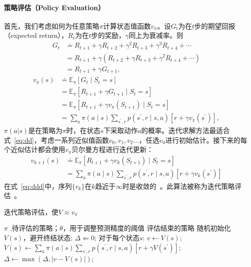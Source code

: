 \paragraph{策略评估（Policy Evaluation）}
首先，我们考虑如何为任意策略$\pi$计算状态值函数$v_{\pi}$。设$G_{t}$为在$t$步的期望回报（expected return），$R_{t}$为在$t$步的奖励，$\gamma$同上为衰减率。则
\begin{equation*}
  \begin{aligned}
  G_{t} & \doteq R_{t+1}+\gamma R_{t+2}+\gamma^{2} R_{t+3}+\gamma^{3} R_{t+4}+\cdots \\
  &=R_{t+1}+\gamma\left(R_{t+2}+\gamma R_{t+3}+\gamma^{2} R_{t+4}+\cdots\right) \\
  &=R_{t+1}+\gamma G_{t+1},
  \end{aligned}
\end{equation*}
\begin{equation}
  \begin{aligned}
  v_{\pi}(s) & \doteq \mathbb{E}_{\pi}\left[G_{t} \mid S_{t}=s\right] \\
  &=\mathbb{E}_{\pi}\left[R_{t+1}+\gamma G_{t+1} \mid S_{t}=s\right] \\
  &=\mathbb{E}_{\pi}\left[R_{t+1}+\gamma v_{\pi}\left(S_{t+1}\right) \mid S_{t}=s\right] \\
  &=\sum_{a} \pi(a \mid s) \sum_{s^{\prime}, r} p\left(s^{\prime}, r \mid s, a\right)\left[r+\gamma v_{\pi}\left(s^{\prime}\right)\right],
  \end{aligned}
  \label{eq:dd}
\end{equation}
$\pi(a|s)$是在策略为$\pi$时，在状态$s$下采取动作$a$的概率。迭代求解方法最适合式~\ref{eq:dd}，考虑一系列近似值函数$v_{0},v_{1},v_{2}\dots$，任选$v_{0}$进行初始估计。接下来的每个近似估计都会使用$v_{\pi}$贝尔曼方程\cite{dixit1990optimization}进行迭代更新：
\begin{equation}
  \begin{aligned}
  v_{k+1}(s) & \doteq \mathbb{E}_{\pi}\left[R_{t+1}+\gamma v_{k}\left(S_{t+1}\right) \mid S_{t}=s\right] \\
  &=\sum_{a} \pi(a \mid s) \sum_{s^{\prime}, r} p\left(s^{\prime}, r \mid s, a\right)\left[r+\gamma v_{k}\left(s^{\prime}\right)\right]
  \end{aligned}
  \label{eq:ddd}
\end{equation}
在式~\ref{eq:ddd}中，序列$\{v_{k}\}$在$k$趋近于$\infty$时是收敛的~\cite{kamien2013dynamic}。此算法被称为迭代策略评估~\cite{Sutton1998}。
\begin{algorithm}[H]
  \caption{迭代策略评估，使$V\approx v_{\pi} $}
  \begin{algorithmic}[1]
    \Require $\pi$ ,待评估的策略；$\theta$，用于调整预测精度的阈值
    \Ensure 评估结束的策略
    \State 随机初始化$V(s)$，避开终结状态;
    \Repeat
    \State $\Delta\Leftarrow 0$;
    \Loop 对于每个状态$s$:
    \State $v \leftarrow V(s)$;
    \State $V(s) \leftarrow \sum_{a} \pi(a \mid s) \sum_{s^{\prime}, r} p\left(s^{\prime}, r \mid s, a\right)\left[r+\gamma V\left(s^{\prime}\right)\right]$;
    \State $\Delta \leftarrow \max (\Delta,|v-V(s)|)$;
    \EndLoop
    \Until{ $\Delta \le \theta$}
  \end{algorithmic}
\end{algorithm}
